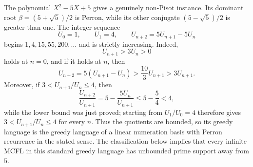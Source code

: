 \begin{example}
  The polynomial \(X^2-5X+5\) gives a genuinely non-Pisot instance. Its
  dominant root \(\beta=(5+\sqrt5)/2\) is Perron, while its other conjugate
  \((5-\sqrt5)/2\) is greater than one. The integer sequence
  \[
    U_0=1,\qquad U_1=4,\qquad
    U_{n+2}=5U_{n+1}-5U_n
  \]
  begins \(1,4,15,55,200,\ldots\) and is strictly increasing. Indeed,
  \[
    U_{n+1}>3U_n>0
  \]
  holds at \(n=0\), and if it holds at \(n\), then
  \[
    U_{n+2}=5(U_{n+1}-U_n)
      >\frac{10}{3}U_{n+1}>3U_{n+1}.
  \]
  Moreover, if \(3<U_{n+1}/U_n\le4\), then
  \[
    \frac{U_{n+2}}{U_{n+1}}
      =5-\frac{5U_n}{U_{n+1}}
      \le 5-\frac54<4,
  \]
  while the lower bound was just proved; starting from \(U_1/U_0=4\)
  therefore gives \(3<U_{n+1}/U_n\le4\) for every \(n\). Thus the quotients
  are bounded, so its greedy language is the greedy language of a linear
  numeration basis with Perron recurrence in the stated sense. The
  classification below implies that every infinite MCFL in this standard
  greedy language has unbounded prime support away from \(5\).
\end{example}

